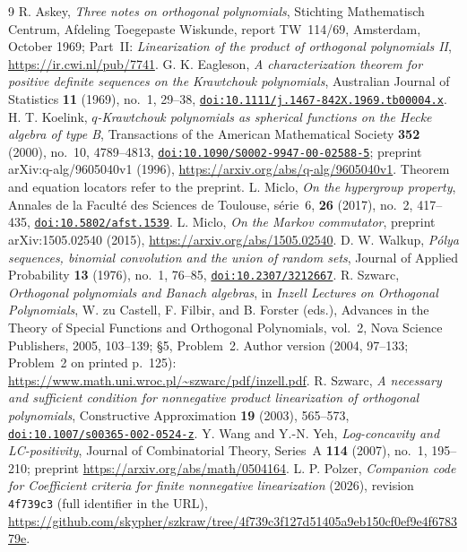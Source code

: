 \documentclass[twoside,10pt]{article}
\numberwithin{equation}{section}
\theoremstyle{slbody}
\theoremstyle{definition}
\theoremstyle{remark}
\begin{document}
\begin{thebibliography}{9}
 R. Askey, \emph{Three notes on orthogonal polynomials}, Stichting Mathematisch Centrum, Afdeling Toegepaste Wiskunde, report TW~114/69, Amsterdam, October 1969; Part~II: \emph{Linearization of the product of orthogonal polynomials II}, \url{https://ir.cwi.nl/pub/7741}.
 G. K. Eagleson, \emph{A characterization theorem for positive definite sequences on the Krawtchouk polynomials}, Australian Journal of Statistics \textbf{11} (1969), no.~1, 29--38, \href{https://doi.org/10.1111/j.1467-842X.1969.tb00004.x}{\nolinkurl{doi:10.1111/j.1467-842X.1969.tb00004.x}}.
 H. T. Koelink, \emph{$q$-Krawtchouk polynomials as spherical functions on the Hecke algebra of type B}, Transactions of the American Mathematical Society \textbf{352} (2000), no.~10, 4789--4813, \href{https://doi.org/10.1090/S0002-9947-00-02588-5}{\nolinkurl{doi:10.1090/S0002-9947-00-02588-5}}; preprint arXiv:q-alg/9605040v1 (1996), \url{https://arxiv.org/abs/q-alg/9605040v1}. Theorem and equation locators refer to the preprint.
 L. Miclo, \emph{On the hypergroup property}, Annales de la Facult\'e des Sciences de Toulouse, s\'erie~6, \textbf{26} (2017), no.~2, 417--435, \href{https://doi.org/10.5802/afst.1539}{\nolinkurl{doi:10.5802/afst.1539}}.
 L. Miclo, \emph{On the Markov commutator}, preprint arXiv:1505.02540 (2015), \url{https://arxiv.org/abs/1505.02540}.
 D. W. Walkup, \emph{Pólya sequences, binomial convolution and the union of random sets}, Journal of Applied Probability \textbf{13} (1976), no.~1, 76--85, \href{https://doi.org/10.2307/3212667}{\nolinkurl{doi:10.2307/3212667}}.
 R. Szwarc, \emph{Orthogonal polynomials and Banach algebras}, in \emph{Inzell Lectures on Orthogonal Polynomials}, W. zu Castell, F. Filbir, and B. Forster (eds.), Advances in the Theory of Special Functions and Orthogonal Polynomials, vol.~2, Nova Science Publishers, 2005, 103--139; \S5, Problem~2. Author version (2004, 97--133; Problem~2 on printed p.~125): \url{https://www.math.uni.wroc.pl/~szwarc/pdf/inzell.pdf}.
 R. Szwarc, \emph{A necessary and sufficient condition for nonnegative product linearization of orthogonal polynomials}, Constructive Approximation \textbf{19} (2003), 565--573, \href{https://doi.org/10.1007/s00365-002-0524-z}{\nolinkurl{doi:10.1007/s00365-002-0524-z}}.
 Y. Wang and Y.-N. Yeh, \emph{Log-concavity and LC-positivity}, Journal of Combinatorial Theory, Series~A \textbf{114} (2007), no.~1, 195--210; preprint \url{https://arxiv.org/abs/math/0504164}.
 L. P. Polzer, \emph{Companion code for Coefficient criteria for finite nonnegative linearization} (2026), revision \texttt{4f739c3} (full identifier in the URL), \url{https://github.com/skypher/szkraw/tree/4f739c3f127d51405a9eb150cf0ef9e4f678379e}.
\end{thebibliography}
\end{document}
